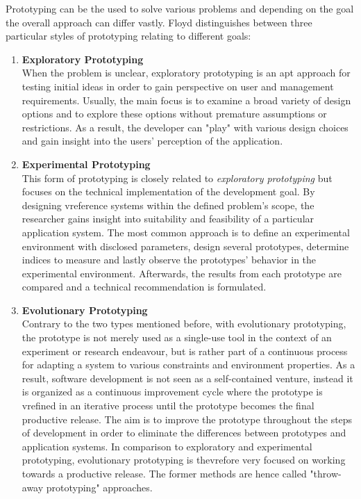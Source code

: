     Prototyping can be the used to solve various problems and depending on the goal the overall approach can differ vastly. Floyd\autocite{Floyd1984APrototyping} distinguishes between three particular styles of prototyping relating to different goals:
    
    \begin{enumerate}
        \item \textbf{Exploratory Prototyping}\\
            When the problem is unclear, exploratory prototyping is an apt approach for testing initial ideas in order to gain perspective on user and management requirements. Usually, the main focus is to examine a broad variety of design options and to explore these options without premature assumptions or restrictions. As a result, the developer can "play" with various design choices and gain insight into the users' perception of the application. 
        \item \textbf{Experimental Prototyping}\\
            This form of prototyping is closely related to \textit{exploratory prototyping} but focuses on the technical implementation of the development goal. By designing vreference systems within the defined problem's scope, the researcher gains insight into suitability and feasibility of a particular application system. The most common approach is to define an experimental environment with disclosed parameters, design several prototypes, determine indices to measure and lastly observe the prototypes' behavior in the experimental environment. Afterwards, the results from each prototype are compared and a technical recommendation is formulated. 
        \item \textbf{Evolutionary Prototyping}\\
            Contrary to the two types mentioned before, with evolutionary prototyping, the prototype is not merely used as a single-use tool in the context of an experiment or research endeavour, but is rather part of a continuous process for adapting a system to various constraints and environment properties. As a result, software development is not seen as a self-contained venture, instead it is organized as a continuous improvement cycle where the prototype is vrefined in an iterative process until the prototype becomes the final productive release. The aim is to improve the prototype throughout the steps of development in order to eliminate the differences between prototypes and application systems. In comparison to exploratory and experimental prototyping, evolutionary prototyping is thevrefore very focused on working towards a productive release. The former methods are hence called "throw-away prototyping" approaches.
    \end{enumerate}
    
